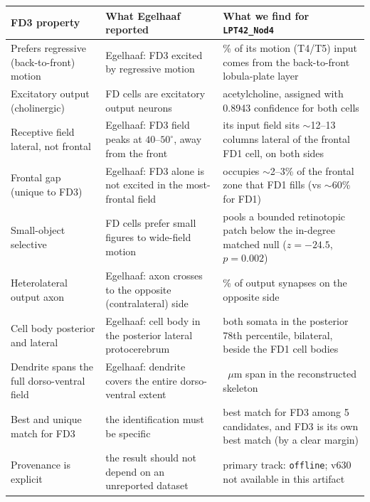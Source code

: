 \documentclass[11pt]{article}
\newcommand{\ttt}[1]{\texttt{#1}}
\begin{document}
\begin{table}[H]\centering\footnotesize\caption{Each defining property of Egelhaaf's FD3 cell and the matching measurement for the FlyWire cell type \ttt{LPT42\_Nod4}.}\label{tab:evidence}

\renewcommand{\arraystretch}{1.25}
\setlength{\tabcolsep}{3pt}
\begin{longtable}{@{}>{\raggedright\arraybackslash}p{} >{\raggedright\arraybackslash}p{} >{\raggedright\arraybackslash}p{}@{}}
\toprule \textbf{FD3 property} & \textbf{What Egelhaaf reported} & \textbf{What we find for \ttt{LPT42\_Nod4}} \\\midrule\endhead
Prefers regressive (back-to-front) motion & Egelhaaf: FD3 excited by regressive motion & 98.58\% of its motion (T4/T5) input comes from the back-to-front lobula-plate layer \\
Excitatory output (cholinergic) & FD cells are excitatory output neurons & acetylcholine, assigned with 0.8943 confidence for both cells \\
Receptive field lateral, not frontal & Egelhaaf: FD3 field peaks at $40$--$50^\circ$, away from the front & its input field sits $\sim$12--13 columns lateral of the frontal FD1 cell, on both sides \\
Frontal gap (unique to FD3) & Egelhaaf: FD3 alone is not excited in the most-frontal field & occupies $\sim$2--3\% of the frontal zone that FD1 fills (vs $\sim$60\% for FD1) \\
Small-object selective & FD cells prefer small figures to wide-field motion & pools a bounded retinotopic patch below the in-degree matched null ($z=-24.5$, $p=0.002$) \\
Heterolateral output axon & Egelhaaf: axon crosses to the opposite (contralateral) side & 90.33\% of output synapses on the opposite side \\
Cell body posterior and lateral & Egelhaaf: cell body in the posterior lateral protocerebrum & both somata in the posterior 78th percentile, bilateral, beside the FD1 cell bodies \\
Dendrite spans the full dorso-ventral field & Egelhaaf: dendrite covers the entire dorso-ventral extent & 155.0~$\mu$m span in the reconstructed skeleton \\
Best and unique match for FD3 & the identification must be specific & best match for FD3 among 5 candidates, and FD3 is its own best match (by a clear margin) \\
Provenance is explicit & the result should not depend on an unreported dataset & primary track: \ttt{offline}; v630 not available in this artifact \\
\bottomrule\end{longtable}
\renewcommand{\arraystretch}{1.0}
\setlength{\tabcolsep}{6pt}

\end{table}
\end{document}
